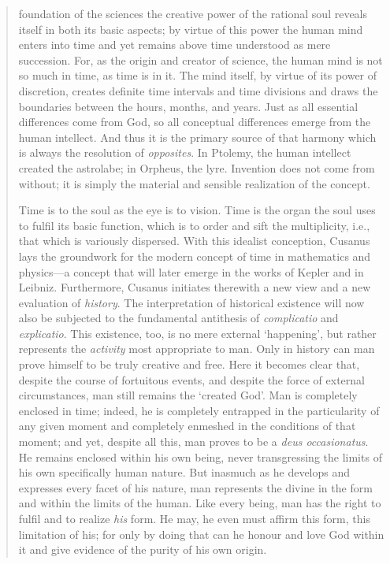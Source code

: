 \begin{quote}
foundation of the sciences the creative power of the rational soul reveals itself in both its basic aspects; by virtue of this power the human mind enters into time and yet remains above time understood as mere succession.  For, as the origin and creator of science, the human mind is not so much in time, as time is in it.  The mind itself, by virtue of its power of discretion, creates definite time intervals and time divisions and draws the boundaries between the hours, months, and years.  Just as all essential differences come from God, so all conceptual differences emerge from the human intellect.  And thus it is the primary source of that harmony which is always the resolution of \emph{opposites}. In Ptolemy, the human intellect created the astrolabe; in Orpheus, the lyre.  Invention does not come from without; it is simply the material and sensible realization of the concept.  

    Time is to the soul as the eye is to vision.  Time is the organ the soul uses to fulfil its basic function, which is to order and sift the multiplicity, i.e., that which is variously dispersed.  With this idealist conception, Cusanus lays the groundwork for the modern concept of time in mathematics and physics---a concept that will later emerge in the works of Kepler and in Leibniz.  Furthermore, Cusanus initiates therewith a new view and a new evaluation of \emph{history}.  The interpretation of historical existence will now also be subjected to the fundamental antithesis of \emph{complicatio} and \emph{explicatio}.  This existence, too, is no mere external `happening', but rather represents the \emph{activity} most appropriate to man. Only in history can man prove himself to be truly creative and free.  Here it becomes clear that, despite the course of fortuitous events, and despite the force of external circumstances, man still remains the `created God'.  Man is completely enclosed in time; indeed, he is completely entrapped in the particularity of any given moment and completely enmeshed in the conditions of that moment; and yet, despite all this, man proves to be a \emph{deus occasionatus}.  He remains enclosed within his own being, never transgressing the limits of his own specifically human nature.  But inasmuch as he develops and expresses every facet of his nature, man represents the divine in the form and within the limits of the human.  Like every being, man has the right to fulfil and to realize \emph{his} form.  He may, he even must affirm this form, this limitation of his; for only by doing that can he honour and love God within it and give evidence of the purity of his own origin.  

    \citep[p. 40-43]{Cassirer1927}
\end{quote}

